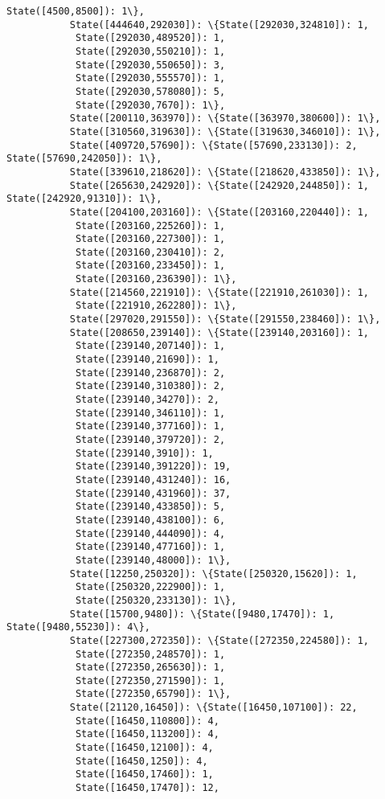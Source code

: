 \documentclass[11pt]{article}
\begin{document}
\begin{Verbatim}[commandchars=\\\{\}]
            State([4500,8500]): 1\},
           State([444640,292030]): \{State([292030,324810]): 1,
            State([292030,489520]): 1,
            State([292030,550210]): 1,
            State([292030,550650]): 3,
            State([292030,555570]): 1,
            State([292030,578080]): 5,
            State([292030,7670]): 1\},
           State([200110,363970]): \{State([363970,380600]): 1\},
           State([310560,319630]): \{State([319630,346010]): 1\},
           State([409720,57690]): \{State([57690,233130]): 2, State([57690,242050]): 1\},
           State([339610,218620]): \{State([218620,433850]): 1\},
           State([265630,242920]): \{State([242920,244850]): 1, State([242920,91310]): 1\},
           State([204100,203160]): \{State([203160,220440]): 1,
            State([203160,225260]): 1,
            State([203160,227300]): 1,
            State([203160,230410]): 2,
            State([203160,233450]): 1,
            State([203160,236390]): 1\},
           State([214560,221910]): \{State([221910,261030]): 1,
            State([221910,262280]): 1\},
           State([297020,291550]): \{State([291550,238460]): 1\},
           State([208650,239140]): \{State([239140,203160]): 1,
            State([239140,207140]): 1,
            State([239140,21690]): 1,
            State([239140,236870]): 2,
            State([239140,310380]): 2,
            State([239140,34270]): 2,
            State([239140,346110]): 1,
            State([239140,377160]): 1,
            State([239140,379720]): 2,
            State([239140,3910]): 1,
            State([239140,391220]): 19,
            State([239140,431240]): 16,
            State([239140,431960]): 37,
            State([239140,433850]): 5,
            State([239140,438100]): 6,
            State([239140,444090]): 4,
            State([239140,477160]): 1,
            State([239140,48000]): 1\},
           State([12250,250320]): \{State([250320,15620]): 1,
            State([250320,222900]): 1,
            State([250320,233130]): 1\},
           State([15700,9480]): \{State([9480,17470]): 1, State([9480,55230]): 4\},
           State([227300,272350]): \{State([272350,224580]): 1,
            State([272350,248570]): 1,
            State([272350,265630]): 1,
            State([272350,271590]): 1,
            State([272350,65790]): 1\},
           State([21120,16450]): \{State([16450,107100]): 22,
            State([16450,110800]): 4,
            State([16450,113200]): 4,
            State([16450,12100]): 4,
            State([16450,1250]): 4,
            State([16450,17460]): 1,
            State([16450,17470]): 12,

\end{Verbatim}
\end{document}
